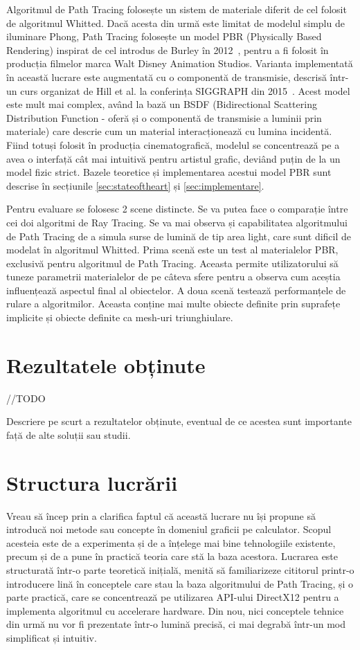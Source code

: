 \documentclass[12pt,a4paper]{report}
\numberwithin{equation}{section} %
\begin{document}
Algoritmul de Path Tracing folosește un sistem de materiale diferit de cel folosit
de algoritmul Whitted. Dacă acesta din urmă este limitat de modelul simplu de iluminare
Phong, Path Tracing folosește un model PBR (Physically Based Rendering) inspirat de
cel introdus de Burley în 2012~\cite{Disney}, pentru a fi folosit în producția filmelor
marca Walt Disney Animation Studios. Varianta implementată în această lucrare este
augmentată cu o componentă de transmisie, descrisă într-un curs organizat de Hill et al. la conferința SIGGRAPH din 2015~\cite{DisneyBSDF}.
Acest model este mult mai complex,
având la bază un BSDF (Bidirectional Scattering Distribution Function - oferă și
o componentă de transmisie a luminii prin materiale) care descrie cum un material
interacționează cu lumina incidentă. Fiind totuși folosit în producția cinematografică,
modelul se concentrează pe a avea o interfață cât mai intuitivă pentru artistul
grafic, deviând puțin de la un model fizic strict. Bazele teoretice și implementarea acestui model
PBR sunt descrise în secțiunile \ref{sec:stateoftheart} și \ref{sec:implementare}.

Pentru evaluare se folosesc 2 scene distincte. Se va putea
face o comparație între cei doi algoritmi de Ray Tracing. Se va mai observa și
capabilitatea algoritmului de Path Tracing de a simula surse de lumină de tip
area light, care sunt dificil de modelat în algoritmul Whitted.
Prima scenă este un test al materialelor PBR, exclusivă pentru algoritmul de Path Tracing.
Aceasta permite utilizatorului să tuneze parametrii materialelor de pe câteva sfere
pentru a observa cum aceștia influențează aspectul final al obiectelor.
A doua scenă testează performanțele de rulare a algoritmilor. Aceasta conține
mai multe obiecte definite prin suprafețe implicite și obiecte
definite ca mesh-uri triunghiulare.

\section{Rezultatele obținute}

//TODO

Descriere pe scurt a rezultatelor obținute, eventual de ce acestea sunt importante față de alte soluții sau studii.

\section{Structura lucrării}

Vreau să încep prin a clarifica faptul că această lucrare nu își propune să introducă
noi metode sau concepte în domeniul graficii pe calculator. Scopul acesteia
este de a experimenta și de a înțelege mai bine tehnologiile existente, precum
și de a pune în practică teoria care stă la baza acestora. Lucrarea este structurată
într-o parte teoretică inițială, menită să familiarizeze cititorul printr-o introducere lină
în conceptele care stau la baza algoritmului de Path Tracing, și o parte practică,
care se concentrează pe utilizarea API-ului DirectX12 pentru a implementa algoritmul
cu accelerare hardware. Din nou, nici conceptele tehnice din urmă nu vor fi prezentate
într-o lumină precisă, ci mai degrabă într-un mod simplificat și intuitiv.
\end{document}
